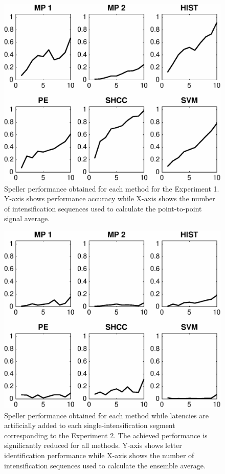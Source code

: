 \begin{figure}[h!]
\centering
\includegraphics[width=15cm]{images/CrossPerformanceTest.eps}
\caption[Experiment I Pseudo-real Dataset III Speller Performance]{Speller performance obtained for each method for the Experiment 1.  Y-axis shows performance accuracy while X-axis shows the number of intensification sequences used to calculate the point-to-point signal average.}
\label{fig:performancetest}
\end{figure}

\begin{figure}[h!]
\centering
\includegraphics[width=15cm]{images/CrossPerformanceTestLatency.eps}
\caption[Experiment II Pseudo-real Dataset III Speller Performance]{Speller performance obtained for each method while latencies are artificially added to each single-intensification segment corresponding to the Experiment 2.  The achieved performance is significantly reduced for all methods. Y-axis shows letter identification performance while X-axis shows the number of intensification sequences used to calculate the ensemble average.}
\label{fig:performancetestlatency}
\end{figure}

